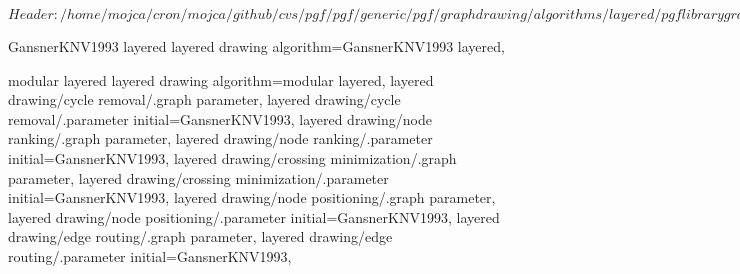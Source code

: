 %
%
%

\ProvidesFileRCS[v\pgfversion] $Header: /home/mojca/cron/mojca/github/cvs/pgf/pgf/generic/pgf/graphdrawing/algorithms/layered/pgflibrarygraphdrawing.layered.code.tex,v 1.4 2011/07/15 15:53:28 jannis-pohlmann Exp $





%
% 




%
%



%
%
%
\pgfgddeclarealgorithmkey
  {GansnerKNV1993 layered}
  {layered drawing}
  {
    algorithm=GansnerKNV1993 layered,
  }


%
%
\pgfgddeclarealgorithmkey
  {modular layered}
  {layered drawing}
  {
    algorithm=modular layered,
    layered drawing/cycle removal/.graph parameter,
    layered drawing/cycle removal/.parameter initial=GansnerKNV1993,
    layered drawing/node ranking/.graph parameter,
    layered drawing/node ranking/.parameter initial=GansnerKNV1993,
    layered drawing/crossing minimization/.graph parameter,
    layered drawing/crossing minimization/.parameter initial=GansnerKNV1993,
    layered drawing/node positioning/.graph parameter,
    layered drawing/node positioning/.parameter initial=GansnerKNV1993,
    layered drawing/edge routing/.graph parameter,
    layered drawing/edge routing/.parameter initial=GansnerKNV1993,
  }
